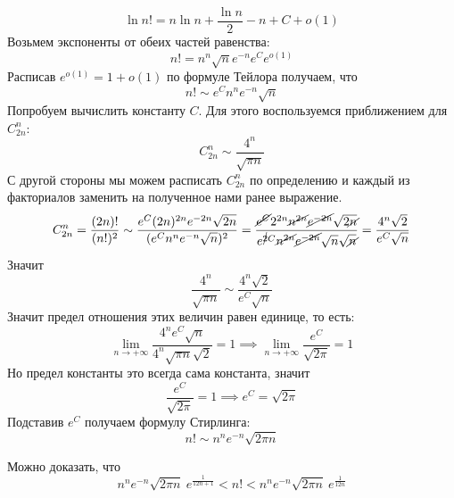 \begin{examples}
\begin{enumerate}
    \begin{equation*}
        \ln n! = n\ln n + \frac{\ln n}{2} - n + C + o(1)
    \end{equation*}
    Возьмем экспоненты от обеих частей равенства:
    \begin{equation*}
        n! = n^{n}\sqrt{n}e^{-n}e^{C}e^{o(1)}
    \end{equation*}
    Расписав $e^{o(1)} = 1 + o(1)$ по формуле Тейлора получаем, что
    \begin{equation*}
        n! \sim e^Cn^ne^{-n}\sqrt{n}
    \end{equation*}
    Попробуем вычислить константу $C$. Для этого воспользуемся приближением для $C_{2n}^{n}$:
    \begin{equation*}
        C_{2n}^{n} \sim \frac{4^n}{\sqrt{\pi n}}
    \end{equation*}
    С другой стороны мы можем расписать $C_{2n}^{n}$ по определению и каждый из факториалов заменить на полученное нами ранее выражение.
    \begin{equation*}
        C_{2n}^{n} = \frac{(2n)!}{(n!)^2} \sim \frac{e^C(2n)^{2n}e^{-2n}\sqrt{2n}}{(e^Cn^ne^{-n}\sqrt{n})^2} =
        \frac{\cancel{e^C}2^{2n}\cancel{n^{2n}}\cancel{e^{-2n}}\sqrt{2\cancel{n}}}{e^{\cancel{2}C}\cancel{n^{2n}}\cancel{e^{-2n}}\sqrt{n}\sqrt{\cancel{n}}} =
        \frac{4^n\sqrt{2}}{e^C\sqrt{n}}
    \end{equation*}
    Значит
    \begin{equation*}
        \frac{4^n}{\sqrt{\pi n}} \sim \frac{4^n \sqrt{2}}{e^C \sqrt{n}}
    \end{equation*}
    Значит предел отношения этих величин равен единице, то есть:
    \begin{equation*}
        \lim\limits_{n \to +\infty} \frac{4^n e^C\sqrt{n}}{4^n \sqrt{\pi n} \sqrt{2}} = 1
        \implies
        \lim\limits_{n \to +\infty} \frac{e^C}{\sqrt{2\pi}} = 1
    \end{equation*}
    Но предел константы это всегда сама константа, значит
    \begin{equation*}
        \frac{e^C}{\sqrt{2\pi}} = 1 \implies e^C = \sqrt{2\pi}
    \end{equation*}
    Подставив $e^C$ получаем формулу Стирлинга:
    \begin{equation*}
        \boxed{n! \sim n^ne^{-n}\sqrt{2\pi n}}
    \end{equation*}
    \begin{notice}
        Можно доказать, что
        \begin{equation*}
            n^ne^{-n}\sqrt{2\pi n} \: e^{\frac{1}{12n + 1}} < n! <
            n^ne^{-n}\sqrt{2\pi n} \: e^{\frac{1}{12n}}
        \end{equation*}
    \end{notice}
  \end{enumerate}
\end{examples}

